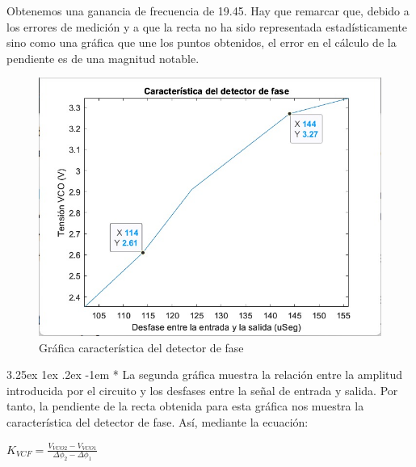 \documentclass[12pt]{article}
\makeatletter
\renewcommand\paragraph{\@startsection{paragraph}{5}{\z@}%
  {3.25ex \@plus1ex \@minus.2ex}%
  {-1em}%
  {\normalfont\normalsize\bfseries}}
\makeatother
\begin{document}
  Obtenemos una ganancia de frecuencia de 19.45. Hay que remarcar que, debido a los errores de medición y a que la recta no ha sido representada estadísticamente sino como
  una gráfica que une los puntos obtenidos,
  el error en el cálculo de la pendiente es de una magnitud notable.

    \begin{figure}[H]
      \centering
      \includegraphics[width=1\linewidth]{img/grafica2.jpeg}
      \caption{Gráfica característica del detector de fase}%
      \label{fig:grafica2}
    \end{figure}
    
    \paragraph*{}
    La segunda gráfica muestra la relación entre la amplitud introducida por el circuito y los desfases entre la señal de entrada y salida. Por tanto, la pendiente de la recta obtenida
para esta gráfica nos muestra la característica del detector de fase. Así, mediante la ecuación:

  \begin{center}
    $K_{VCF} = \frac{V_{VCO2} - V_{VCO1}}{\Delta\phi_{2} - \Delta\phi_{1}}$
  \end{center}
    
\end{document}
